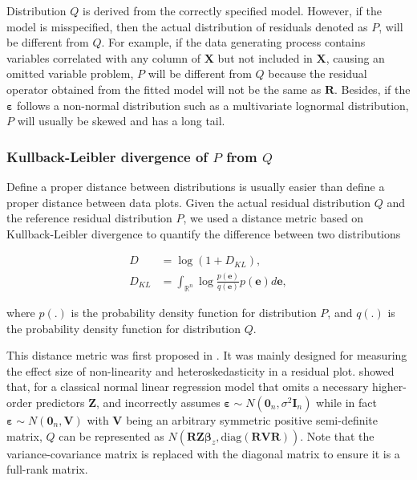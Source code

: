 \documentclass[]{interact}
\theoremstyle{plain}%
\theoremstyle{definition}
\theoremstyle{remark}
\begin{document}
Distribution \(Q\) is derived from the correctly specified model.
However, if the model is misspecified, then the actual distribution of
residuals denoted as \(P\), will be different from \(Q\). For example,
if the data generating process contains variables correlated with any
column of \(\boldsymbol{X}\) but not included in \(\boldsymbol{X}\),
causing an omitted variable problem, \(P\) will be different from \(Q\)
because the residual operator obtained from the fitted model will not be
the same as \(\boldsymbol{R}\). Besides, if the
\(\boldsymbol{\varepsilon}\) follows a non-normal distribution such as a
multivariate lognormal distribution, \(P\) will usually be skewed and
has a long tail.

\hypertarget{kullback-leibler-divergence-of-p-from-q}{%
\subsubsection{\texorpdfstring{Kullback-Leibler divergence of \(P\) from
\(Q\)}{Kullback-Leibler divergence of P from Q}}\label{kullback-leibler-divergence-of-p-from-q}}

Define a proper distance between distributions is usually easier than
define a proper distance between data plots. Given the actual residual
distribution \(Q\) and the reference residual distribution \(P\), we
used a distance metric based on Kullback-Leibler divergence
\citep{kullback1951information} to quantify the difference between two
distributions

\begin{align}
\label{eq:kl-0}
D &= \log\left(1 + D_{KL}\right), \\
\label{eq:kl-1}
D_{KL} &= \int_{\mathbb{R}^{n}}\log\frac{p(\boldsymbol{e})}{q(\boldsymbol{e})}p(\boldsymbol{e})d\boldsymbol{e},
\end{align}

\noindent where \(p(.)\) is the probability density function for
distribution \(P\), and \(q(.)\) is the probability density function for
distribution \(Q\).

This distance metric was first proposed in \citet{li2023plot}. It was
mainly designed for measuring the effect size of non-linearity and
heteroskedasticity in a residual plot. \citet{li2023plot} showed that,
for a classical normal linear regression model that omits a necessary
higher-order predictors \(\boldsymbol{Z}\), and incorrectly assumes
\(\boldsymbol{\varepsilon} \sim N(\boldsymbol{0}_n,\sigma^2\boldsymbol{I}_n)\)
while in fact
\(\boldsymbol{\varepsilon} \sim N(\boldsymbol{0}_n, \boldsymbol{V})\)
with \(\boldsymbol{V}\) being an arbitrary symmetric positive
semi-definite matrix, \(Q\) can be represented as
\(N(\boldsymbol{R}\boldsymbol{Z}\boldsymbol{\beta}_z, \text{diag}(\boldsymbol{R}\boldsymbol{V}\boldsymbol{R}))\).
Note that the variance-covariance matrix is replaced with the diagonal
matrix to ensure it is a full-rank matrix.
\end{document}
